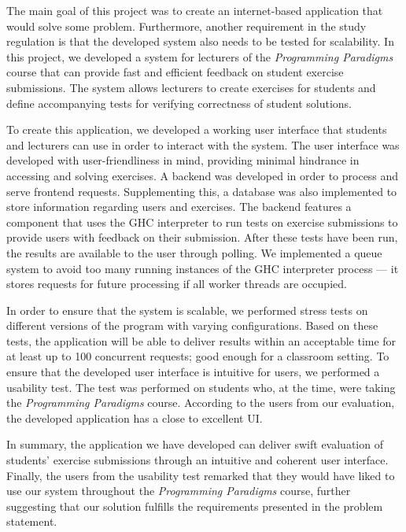 The main goal of this project was to create an internet-based application that would solve some problem.
Furthermore, another requirement in the study regulation is that the developed system also needs to be tested for scalability. 
In this project, we developed a system for lecturers of the \textit{Programming Paradigms} course that can provide fast and efficient feedback on student exercise submissions.
The system allows lecturers to create exercises for students and define accompanying tests for verifying correctness of student solutions.

To create this application, we developed a working user interface that students and lecturers can use in order to interact with the system. 
The user interface was developed with user-friendliness in mind, providing minimal hindrance in accessing and solving exercises. 
A backend was developed in order to process and serve frontend requests. 
Supplementing this, a database was also implemented to store information regarding users and exercises.
The backend features a component that uses the GHC interpreter to run tests on exercise submissions to provide users with feedback on their submission.
After these tests have been run, the results are available to the user through polling.
We implemented a queue system to avoid too many running instances of the GHC interpreter process --- it stores requests for future processing if all worker threads are occupied.

In order to ensure that the system is scalable, we performed stress tests on different versions of the program with varying configurations.
Based on these tests, the application will be able to deliver results within an acceptable time for at least up to 100 concurrent requests; good enough for a classroom setting. 
To ensure that the developed user interface is intuitive for users, we performed a usability test.
The test was performed on students who, at the time, were taking the \textit{Programming Paradigms} course.
According to the users from our evaluation, the developed application has a close to excellent UI. 

In summary, the application we have developed can deliver swift evaluation of students' exercise submissions through an intuitive and coherent user interface. 
Finally, the users from the usability test remarked that they would have liked to use our system throughout the \textit{Programming Paradigms} course, further suggesting that our solution fulfills the requirements presented in the problem statement.